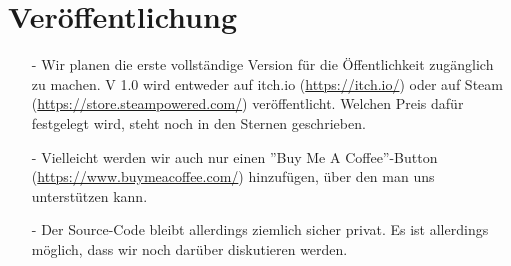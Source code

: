 \section{Veröffentlichung}
\begin{itemize}
    \item[-] Wir planen die erste vollständige Version für die Öffentlichkeit zugänglich zu machen. V 1.0 wird entweder auf itch.io (\url{https://itch.io/}) oder auf Steam 
    (\url{https://store.steampowered.com/}) veröffentlicht. Welchen Preis dafür festgelegt wird, steht noch in den Sternen geschrieben.
    \item[-] Vielleicht werden wir auch nur einen ''Buy Me A Coffee''-Button (\url{https://www.buymeacoffee.com/}) hinzufügen, über den man uns unterstützen kann. 
    \item[-] Der Source-Code bleibt allerdings ziemlich sicher privat. Es ist allerdings möglich, dass wir noch darüber diskutieren werden. 
\end{itemize}



